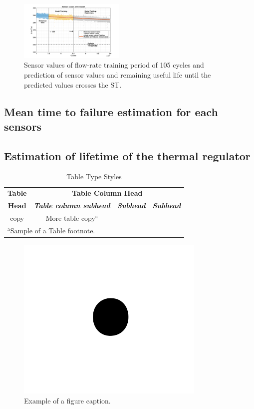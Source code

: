 \documentclass[conference]{IEEEtran}
\begin{document}
\begin{figure}[htbp]
\centerline{\includegraphics[width=0.45\textwidth]{Model.png}}
\caption{Sensor values of flow-rate training period of 105 cycles and prediction of sensor values and remaining useful life until the predicted values crosses the ST.}
\label{fig:Model}
\end{figure}

\subsection{Mean time to failure estimation for each sensors}
\label{subsec:MTTF}



\subsection{Estimation of lifetime of the thermal regulator}
\label{subsec:Lifetime}


\begin{table}[htbp]
\caption{Table Type Styles}
\begin{center}
\begin{tabular}{|c|c|c|c|}
\hline
\textbf{Table}&\multicolumn{3}{|c|}{\textbf{Table Column Head}} \\
\cline{2-4}
\textbf{Head} & \textbf{\textit{Table column subhead}}& \textbf{\textit{Subhead}}& \textbf{\textit{Subhead}} \\
\hline
copy& More table copy$^{\mathrm{a}}$& &  \\
\hline
\multicolumn{4}{l}{$^{\mathrm{a}}$Sample of a Table footnote.}
\end{tabular}
\label{tab1}
\end{center}
\end{table}

\begin{figure}[htbp]
\centerline{\includegraphics{fig1.png}}
\caption{Example of a figure caption.}
\label{fig}
\end{figure}
\end{document}
